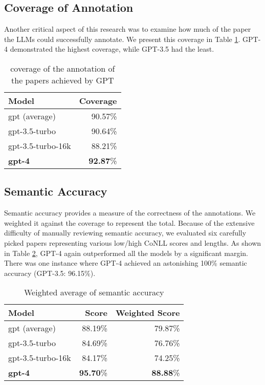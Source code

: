 \subsection{Coverage of Annotation}
Another critical aspect of this research was to examine how much of the paper the LLMs could successfully annotate. We present this coverage in Table \ref{tab:anno-percentage}. GPT-4 demonstrated the highest coverage, while GPT-3.5 had the least.

\begin{table}[htpb]
  \centering
  \begin{tabular}{lr}
    \hline
    Model & Coverage \\
    \hline
    gpt (average) & 90.57\% \\
    gpt-3.5-turbo & 90.64\% \\
    gpt-3.5-turbo-16k & 88.21\% \\
    \textbf{gpt-4} & \textbf{92.87}\% \\
    \hline
  \end{tabular}
  \caption[Total coverage]{coverage of the annotation of the papers achieved by GPT}
  \label{tab:anno-percentage}
\end{table}

\subsection{Semantic Accuracy}
Semantic accuracy provides a measure of the correctness of the annotations. We weighted it against the coverage to represent the total. Because of the extensive difficulty of manually reviewing semantic accuracy, we evaluated six carefully picked papers representing various low/high CoNLL scores and lengths. As shown in Table \ref{tab:semantic-accuracy}, GPT-4 again outperformed all the models by a significant margin. There was one instance where GPT-4 achieved an astonishing 100\% semantic accuracy (GPT-3.5: 96.15\%).

\begin{table}[htpb]
  \centering
  \begin{tabular}{lrr}
    \hline
    Model & Score & Weighted Score \\
    \hline
    gpt (average) & 88.19\% & 79.87\% \\
    gpt-3.5-turbo & 84.69\% & 76.76\% \\
    gpt-3.5-turbo-16k & 84.17\% & 74.25\% \\
    \textbf{gpt-4} & \textbf{95.70}\% & \textbf{88.88}\% \\
    \hline
  \end{tabular}
  \caption[Semantic Accuracy]{Weighted average of semantic accuracy}
  \label{tab:semantic-accuracy}
\end{table}

